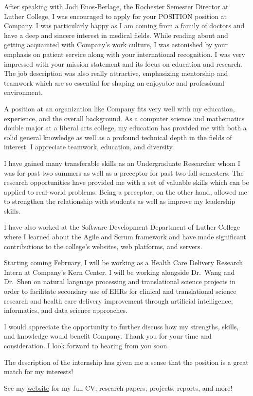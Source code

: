 \documentclass[a4paper,10pt,sans]{moderncv}
\date{\today}
\begin{document}
\makelettertitle%

\justify%

After speaking with Jodi Enos-Berlage, the Rochester Semester Director at
Luther College, I was encouraged to apply for your POSITION position at
Company. I was particularly happy as I am coming from a family of doctors and
have a deep and sincere interest in medical fields. While reading about and
getting acquainted with Company's work culture, I was astonished by your
emphasis on patient service along with your international recognition. I was
very impressed with your mission statement and its focus on education and
research.  The job description was also really attractive, emphasizing
mentorship and teamwork which are so essential for shaping an enjoyable and
professional environment.

A position at an organization like Company fits very well with my education,
experience, and the overall background. As a computer science and mathematics
double major at a liberal arts college, my education has provided me with both
a solid general knowledge as well as a profound technical depth in the fields
of interest. I appreciate teamwork, education, and diversity.

I have gained many transferable skills as an Undergraduate Researcher whom I
was for past two summers as well as a preceptor for past two fall semesters.
The research opportunities have provided me with a set of valuable skills which
can be applied to real-world problems. Being a preceptor, on the other hand,
allowed me to strengthen the relationship with students as well as improve my
leadership skills.

I have also worked at the Software Development Department of Luther College
where I learned about the Agile and Scrum framework and have made significant
contributions to the college's websites, web platforms, and servers.

Starting coming February, I will be working as a Health Care Delivery Research
Intern at Company's Kern Center. I will be working alongside Dr.~Wang and
Dr.~Shen on natural language processing and translational science projects in
order to facilitate secondary use of EHRs for clinical and translational
science research and health care delivery improvement through artificial
intelligence, informatics, and data science approaches.

I would appreciate the opportunity to further discuss how my strengths, skills,
and knowledge would benefit Company. Thank you for your time and consideration.
I look forward to hearing from you soon.

The description of the internship has given me a sense that the position is a
great match for my interests!

See my \href{https://www.davidoniani.com}{website} for my full CV, research
papers, projects, reports, and more!

\makeletterclosing%
\end{document}
